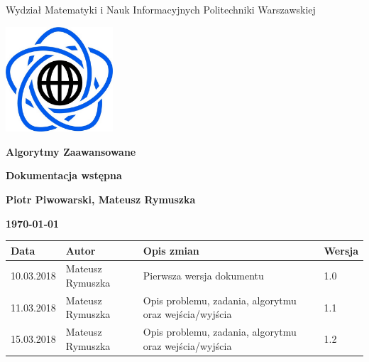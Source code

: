 \documentclass[10pt,a4paper]{article}
\begin{document}
	\begin{titlepage}
		\begin{center}
			{\fontsize{14}{12}\selectfont Wydział Matematyki i Nauk Informacyjnych Politechniki Warszawskiej}
			
		\end{center}
		
		\vspace{1cm}
		\begin{center}
			\includegraphics[width=0.3\textwidth]{images/logo.png}
		\end{center}
		\vspace{3cm}
		
		\begin{center}
			\textbf{{\fontsize{26}{12}\selectfont Algorytmy Zaawansowane}}
			
			\vspace{2cm}
			\textbf{{\fontsize{22}{12}\selectfont Dokumentacja wstępna}}
			\vspace{1cm}
			
			\textbf{{\fontsize{13.5}{12}\selectfont Piotr Piwowarski, Mateusz Rymuszka}}
			
			\vspace{6cm}
			\textbf{{\fontsize{13.5}{12}\selectfont \today}}
		\end{center}  
	\end{titlepage}
	
	{\fontsize{13.5}{12}\selectfont
		\tableofcontents
		\vspace{1cm}
		{\renewcommand{\arraystretch}{2.0}
			
			\begin{tabularx}{\textwidth}{|l|l|X|l|}
				\hline 
				Data & Autor & Opis zmian & Wersja\\
				\hline
				10.03.2018 & Mateusz Rymuszka & Pierwsza wersja dokumentu & 1.0 \\
				\hline
				11.03.2018 & Mateusz Rymuszka & Opis problemu, zadania, algorytmu oraz wejścia/wyjścia & 1.1 \\
				\hline
				15.03.2018 & Mateusz Rymuszka & Opis problemu, zadania, algorytmu oraz wejścia/wyjścia & 1.2 \\
				\hline
			\end{tabularx} 
	}}
	
\end{document}
